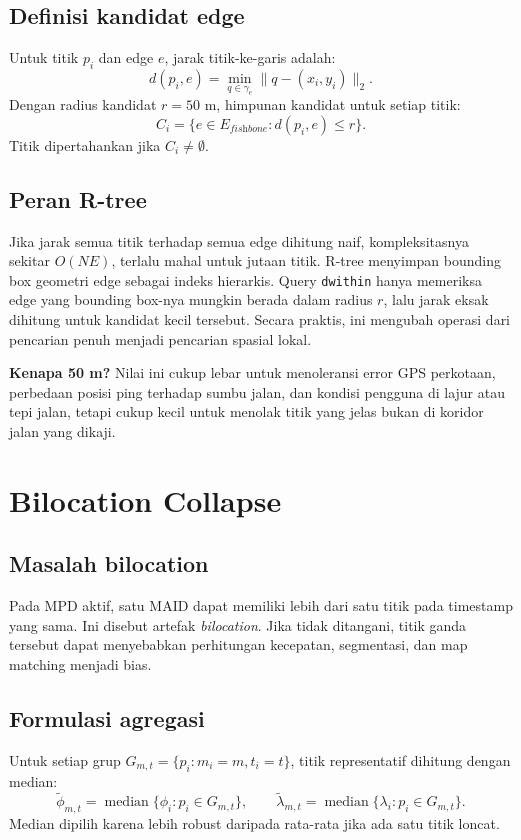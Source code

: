 \documentclass[11pt,a4paper]{article}
\newcommand{\fishbone}{\textit{fishbone}}
\begin{document}
\subsection{Definisi kandidat edge}
Untuk titik $p_i$ dan edge $e$, jarak titik-ke-garis adalah:
\[
d(p_i,e)=\min_{q\in\gamma_e}\|q-(x_i,y_i)\|_2.
\]
Dengan radius kandidat $r=50$ m, himpunan kandidat untuk setiap titik:
\[
C_i=\{e\in E_{\fishbone}: d(p_i,e)\leq r\}.
\]
Titik dipertahankan jika $C_i\neq\emptyset$.

\subsection{Peran R-tree}
Jika jarak semua titik terhadap semua edge dihitung naif, kompleksitasnya sekitar $O(NE)$, terlalu mahal untuk jutaan titik. R-tree menyimpan bounding box geometri edge sebagai indeks hierarkis. Query \texttt{dwithin} hanya memeriksa edge yang bounding box-nya mungkin berada dalam radius $r$, lalu jarak eksak dihitung untuk kandidat kecil tersebut. Secara praktis, ini mengubah operasi dari pencarian penuh menjadi pencarian spasial lokal.

\textbf{Kenapa 50 m?} Nilai ini cukup lebar untuk menoleransi error GPS perkotaan, perbedaan posisi ping terhadap sumbu jalan, dan kondisi pengguna di lajur atau tepi jalan, tetapi cukup kecil untuk menolak titik yang jelas bukan di koridor jalan yang dikaji.

\section{Bilocation Collapse}
\subsection{Masalah bilocation}
Pada MPD aktif, satu MAID dapat memiliki lebih dari satu titik pada timestamp yang sama. Ini disebut artefak \textit{bilocation}. Jika tidak ditangani, titik ganda tersebut dapat menyebabkan perhitungan kecepatan, segmentasi, dan map matching menjadi bias.

\subsection{Formulasi agregasi}
Untuk setiap grup $G_{m,t}=\{p_i:m_i=m,t_i=t\}$, titik representatif dihitung dengan median:
\[
\tilde{\phi}_{m,t}=\operatorname{median}\{\phi_i:p_i\in G_{m,t}\},\qquad
\tilde{\lambda}_{m,t}=\operatorname{median}\{\lambda_i:p_i\in G_{m,t}\}.
\]
Median dipilih karena lebih robust daripada rata-rata jika ada satu titik loncat.
\end{document}
